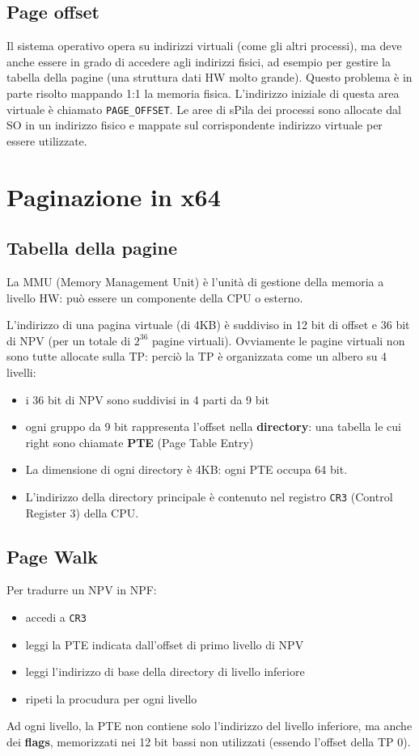 \documentclass[12pt, a4paper]{report}
\begin{document}
\subsection{Page offset}
Il sistema operativo opera su indirizzi virtuali (come gli altri processi), ma
deve anche essere in grado di accedere agli indirizzi fisici, ad esempio per
gestire la tabella della pagine (una struttura dati HW molto grande). Questo
problema è in parte risolto mappando 1:1 la memoria fisica. L'indirizzo
iniziale di questa area virtuale è chiamato \texttt{PAGE\_OFFSET}.
Le aree di sPila dei processi sono allocate dal SO in un indirizzo fisico e
mappate sul corrispondente indirizzo virtuale per essere utilizzate.
\section{Paginazione in x64}
\subsection{Tabella della pagine}
La MMU (Memory Management Unit) è l'unità di gestione della memoria a livello
HW: può essere un componente della CPU o esterno.

L'indirizzo di una pagina virtuale (di 4KB) è suddiviso in 12 bit di offset e
36 bit di NPV (per un totale di $2^{36}$ pagine virtuali). Ovviamente le pagine
virtuali non sono tutte allocate sulla TP: perciò la TP è organizzata come un
albero su 4 livelli:
\begin{itemize}
	\item i 36 bit di NPV sono suddivisi in 4 parti da 9 bit
	\item ogni gruppo da 9 bit rappresenta l'offset nella \textbf{directory}:
		una tabella le cui right sono chiamate \textbf{PTE} (Page Table Entry)
	\item La dimensione di ogni directory è 4KB: ogni PTE occupa 64 bit.
	\item L'indirizzo della directory principale è contenuto nel registro
		\texttt{CR3} (Control Register 3) della CPU.
\end{itemize}
\subsection{Page Walk}
Per tradurre un NPV in NPF:
\begin{itemize}
	\item accedi a \texttt{CR3}
	\item leggi la PTE indicata dall'offset di primo livello di NPV
	\item leggi l'indirizzo di base della directory di livello inferiore
	\item ripeti la procudura per ogni livello
\end{itemize}
Ad ogni livello, la PTE non contiene solo l'indirizzo del livello inferiore, ma
anche dei \textbf{flags}, memorizzati nei 12 bit bassi non utilizzati (essendo
l'offset della TP 0).
\end{document}
